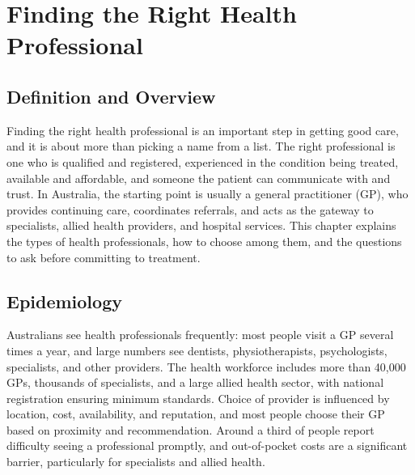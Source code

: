 \chapter{Finding the Right Health Professional}

\section*{Definition and Overview}
Finding the right health professional is an important step in getting good care, and it is about more than picking a name from a list. The right professional is one who is qualified and registered, experienced in the condition being treated, available and affordable, and someone the patient can communicate with and trust. In Australia, the starting point is usually a general practitioner (GP), who provides continuing care, coordinates referrals, and acts as the gateway to specialists, allied health providers, and hospital services. This chapter explains the types of health professionals, how to choose among them, and the questions to ask before committing to treatment.

\section*{Epidemiology}
Australians see health professionals frequently: most people visit a GP several times a year, and large numbers see dentists, physiotherapists, psychologists, specialists, and other providers. The health workforce includes more than 40,000 GPs, thousands of specialists, and a large allied health sector, with national registration ensuring minimum standards. Choice of provider is influenced by location, cost, availability, and reputation, and most people choose their GP based on proximity and recommendation. Around a third of people report difficulty seeing a professional promptly, and out-of-pocket costs are a significant barrier, particularly for specialists and allied health.

